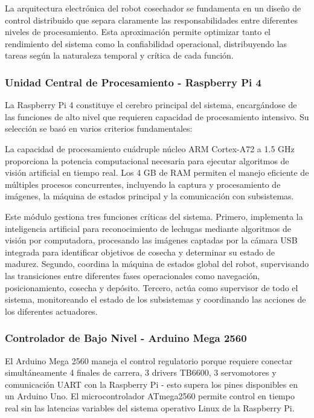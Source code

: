 La arquitectura electrónica del robot cosechador se fundamenta en un diseño de control distribuido que separa claramente las responsabilidades entre diferentes niveles de procesamiento. Esta aproximación permite optimizar tanto el rendimiento del sistema como la confiabilidad operacional, distribuyendo las tareas según la naturaleza temporal y crítica de cada función.

\subsubsection{Unidad Central de Procesamiento - Raspberry Pi 4}

La Raspberry Pi 4 constituye el cerebro principal del sistema, encargándose de las funciones de alto nivel que requieren capacidad de procesamiento intensivo. Su selección se basó en varios criterios fundamentales:

La capacidad de procesamiento cuádruple núcleo ARM Cortex-A72 a 1.5 GHz proporciona la potencia computacional necesaria para ejecutar algoritmos de visión artificial en tiempo real. Los 4 GB de RAM permiten el manejo eficiente de múltiples procesos concurrentes, incluyendo la captura y procesamiento de imágenes, la máquina de estados principal y la comunicación con subsistemas.

Este módulo gestiona tres funciones críticas del sistema. Primero, implementa la inteligencia artificial para reconocimiento de lechugas mediante algoritmos de visión por computadora, procesando las imágenes captadas por la cámara USB integrada para identificar objetivos de cosecha y determinar su estado de madurez. Segundo, coordina la máquina de estados global del robot, supervisando las transiciones entre diferentes fases operacionales como navegación, posicionamiento, cosecha y depósito. Tercero, actúa como supervisor de todo el sistema, monitoreando el estado de los subsistemas y coordinando las acciones de los diferentes actuadores.

\subsubsection{Controlador de Bajo Nivel - Arduino Mega 2560}

El Arduino Mega 2560 maneja el control regulatorio porque requiere conectar simultáneamente 4 finales de carrera, 3 drivers TB6600, 3 servomotores y comunicación UART con la Raspberry Pi - esto supera los pines disponibles en un Arduino Uno. El microcontrolador ATmega2560 permite control en tiempo real sin las latencias variables del sistema operativo Linux de la Raspberry Pi.

